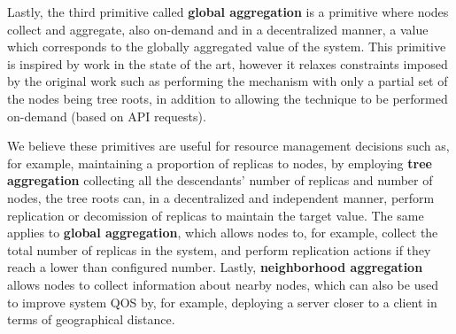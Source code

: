 Lastly, the third primitive called \textbf{global aggregation} is a primitive where nodes collect and aggregate, also on-demand and in a decentralized manner, a value which corresponds to the globally aggregated value of the system. This primitive is inspired by work in the state of the art, however it relaxes constraints imposed by the original work such as performing the mechanism with only a partial set of the nodes being tree roots, in addition to allowing the technique to be performed on-demand (based on API requests).

We believe these primitives are useful for resource management decisions such as, for example, maintaining a proportion of replicas to nodes, by employing \textbf{tree aggregation} collecting all the descendants' number of replicas and number of nodes, the tree roots can, in a decentralized and independent manner, perform replication or decomission of replicas to maintain the target value. The same applies to \textbf{global aggregation}, which allows nodes to, for example, collect the total number of replicas in the system, and perform replication actions if they reach a lower than configured number. Lastly, \textbf{neighborhood aggregation} allows nodes to collect information about nearby nodes, which can also be used to improve system QOS by, for example, deploying a server closer to a client in terms of geographical distance.